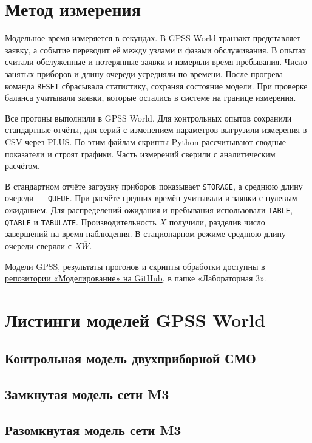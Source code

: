 \documentclass[a4paper,12pt]{article}
\begin{document}
\section{Метод измерения}

Модельное время измеряется в секундах. В GPSS World транзакт
представляет заявку, а событие переводит её между узлами и фазами
обслуживания. В опытах считали обслуженные и потерянные заявки
и измеряли время пребывания.
Число занятых приборов и длину очереди усредняли по времени.
После прогрева команда \texttt{RESET} сбрасывала статистику,
сохраняя состояние модели. При проверке баланса учитывали заявки,
которые остались в системе на границе измерения.

Все прогоны выполнили в GPSS World. Для контрольных опытов
сохранили стандартные отчёты, для серий с изменением параметров
выгрузили измерения в CSV через PLUS. По этим файлам скрипты Python
рассчитывают сводные показатели и строят графики. Часть измерений
сверили с аналитическим расчётом.

В стандартном отчёте загрузку приборов показывает \texttt{STORAGE},
а среднюю длину очереди — \texttt{QUEUE}. При расчёте средних времён
учитывали и заявки с нулевым ожиданием. Для распределений ожидания
и пребывания использовали \texttt{TABLE}, \texttt{QTABLE}
и \texttt{TABULATE}. Производительность \(X\) получили,
разделив число завершений на время наблюдения. В стационарном
режиме среднюю длину очереди сверяли с \(X\overline W\).

Модели GPSS, результаты прогонов и скрипты обработки доступны
в \href{https://github.com/Axe-On-You/Modeling}{репозитории
«Моделирование» на GitHub}, в папке «Лабораторная 3».






\clearpage
\appendix
\section{Листинги моделей GPSS World}

\subsection{Контрольная модель двухприборной СМО}


\subsection{Замкнутая модель сети M3}


\subsection{Разомкнутая модель сети M3}

\end{document}
